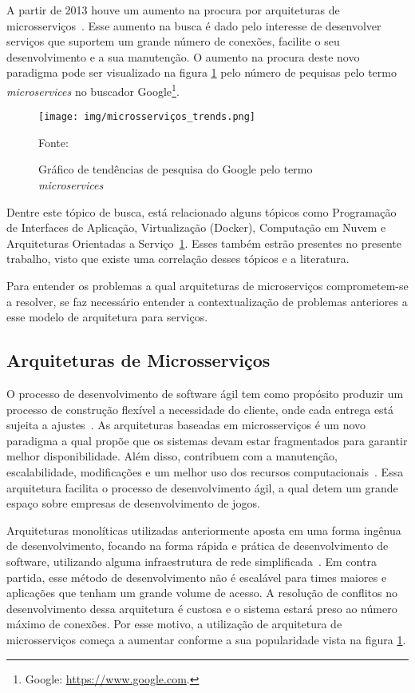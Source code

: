A partir de 2013 houve um aumento na procura por arquiteturas de microsserviços~\cite{google_trends:2018}.
%
Esse aumento na busca é dado pelo interesse de desenvolver serviços que suportem um grande número de conexões, facilite o seu desenvolvimento e a sua manutenção.
%
O aumento na procura deste novo paradigma pode ser visualizado na figura \ref{fig:trends} pelo número de pequisas pelo termo \textit{microservices} no buscador Google\footnote{Google: \url{https://www.google.com}.}.



\begin{figure}[htb!]
  \caption{Gráfico de tendências de pesquisa do Google pelo termo \textit{microservices}}
  \label{fig:trends}
  \texttt{[image: img/microsserviços\_trends.png]}
  \centering

  Fonte:~\cite{google_trends:2018}
\end{figure}


Dentre este tópico de busca, está relacionado alguns tópicos como Programação de Interfaces de Aplicação, Virtualização (Docker), Computação em Nuvem e Arquiteturas Orientadas a Serviço~\ref{fig:trends}.
%
Esses também estrão presentes no presente trabalho, visto que existe uma correlação desses tópicos e a literatura.

Para entender os problemas a qual arquiteturas de microserviços comprometem-se a resolver, se faz necessário entender a contextualização de problemas anteriores a esse modelo de arquitetura para serviços.

\subsection{Arquiteturas de Microsserviços}

O processo de desenvolvimento de software ágil tem como propósito produzir um processo de construção flexível a necessidade do cliente,
%
onde cada entrega está sujeita a ajustes~\cite{joseph_cooper, 8169955}.
%
As arquiteturas baseadas em microsserviços é um novo paradigma a qual propõe que os sistemas devam estar fragmentados para garantir melhor disponibilidade.
%
Além disso, contribuem com a manutenção, escalabilidade, modificações e um melhor uso dos recursos computacionais~\cite{newman2015building, 8169955}.
%
Essa arquitetura facilita o processo de desenvolvimento ágil, a qual detem um grande espaço sobre empresas de desenvolvimento de jogos.

Arquiteturas monolíticas utilizadas anteriormente aposta em uma forma ingênua de desenvolvimento, focando na forma rápida e prática de desenvolvimento de software,
%
utilizando alguma infraestrutura de rede simplificada~\cite{joseph_cooper}.
%
Em contra partida, esse método de desenvolvimento não é escalável para times maiores e aplicações que tenham um grande volume de acesso.
%
A resolução de conflitos no desenvolvimento dessa arquitetura é custosa e o sistema estará preso ao número máximo de conexões.
%
Por esse motivo, a utilização de arquitetura de microsserviços começa a aumentar conforme a sua popularidade vista na figura \ref{fig:trends}.

